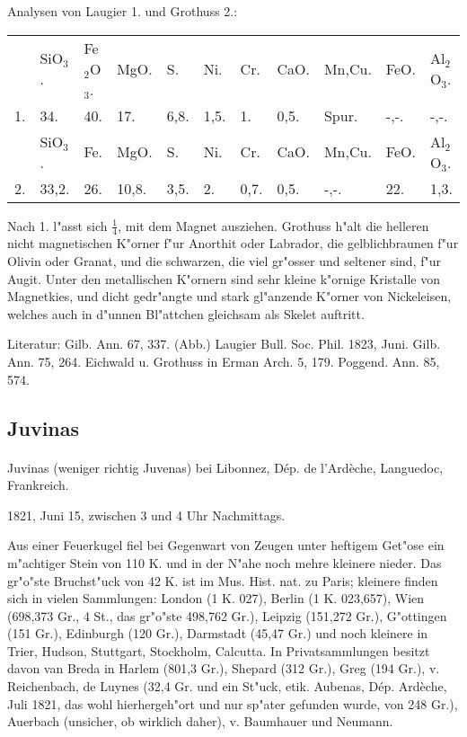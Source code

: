 \documentclass[a4paper, 11pt, oneside]{article}
\begin{document}
Analysen von Laugier 1. und Grothuss 2.:
\begin{table}[!ht]
    \centering
    \begin{tabular}{p{3mm} p{6mm} p{7mm} p{6mm} p{6mm} p{6mm} p{6mm} p{6mm} p{12mm} p{6mm} p{6mm}}
         & SiO$_{3}$. & Fe$_{2}$O$_{3}$. & MgO. & S. & Ni. & Cr. & CaO. & Mn,Cu. & FeO. & Al$_{2}$O$_{3}$. \\
        1. & 34. & 40. & 17. & 6,8. & 1,5. & 1. & 0,5. & Spur. & -,-. & -,-. \\ \hline
         & SiO$_{3}$. & Fe. & MgO. & S. & Ni. & Cr. & CaO. & Mn,Cu. & FeO. & Al$_{2}$O$_{3}$. \\
        2. & 33,2. & 26. & 10,8. & 3,5. & 2. & 0,7. & 0,5. & -,-. & 22. & 1,3. \\
    \end{tabular}
\end{table}

Nach 1. l"asst sich $\frac{1}{4}$, mit dem Magnet ausziehen. Grothuss h"alt die helleren nicht magnetischen K"orner f"ur Anorthit oder Labrador, die gelblichbraunen f"ur Olivin oder Granat, und die schwarzen, die viel gr"osser und seltener sind, f"ur Augit. Unter den metallischen K"ornern sind sehr kleine k"ornige Kristalle von Magnetkies, und dicht gedr"angte und stark gl"anzende K"orner von Nickeleisen, welches auch in d"unnen Bl"attchen gleichsam als Skelet auftritt.

\footnotesize
Literatur: Gilb. Ann. 67, 337. (Abb.) Laugier Bull. Soc. Phil. 1823, Juni. Gilb. Ann. 75, 264. Eichwald u. Grothuss in Erman Arch. 5, 179. Poggend. Ann. 85, 574.
\subsection{Juvinas}
\normalsize
\paragraph{}
Juvinas (weniger richtig Juvenas) bei Libonnez, Dép. de l'Ardèche, Languedoc, Frankreich.

1821, Juni 15, zwischen 3 und 4 Uhr Nachmittags.

Aus einer Feuerkugel fiel bei Gegenwart von Zeugen unter heftigem Get"ose ein m"achtiger Stein von 110 K. und in der N"ahe noch mehre kleinere nieder. Das gr"o"ste Bruchst"uck von 42 K. ist im Mus. Hist. nat. zu Paris; kleinere finden sich in vielen Sammlungen: London (1 K. 027), Berlin (1 K. 023,657), Wien (698,373 Gr., 4 St., das gr"o"ste 498,762 Gr.), Leipzig (151,272 Gr.), G"ottingen (151 Gr.), Edinburgh (120 Gr.), Darmstadt (45,47 Gr.) und noch kleinere in Trier, Hudson, Stuttgart, Stockholm, Calcutta. In Privatsammlungen besitzt davon van Breda in Harlem (801,3 Gr.), Shepard (312 Gr.), Greg (194 Gr.), v. Reichenbach, de Luynes (32,4 Gr. und ein St"uck, etik. Aubenas, Dép. Ardèche, Juli 1821, das wohl hierhergeh"ort und nur sp"ater gefunden wurde, von 248 Gr.), Auerbach (unsicher, ob wirklich daher), v. Baumhauer und Neumann.
\end{document}
